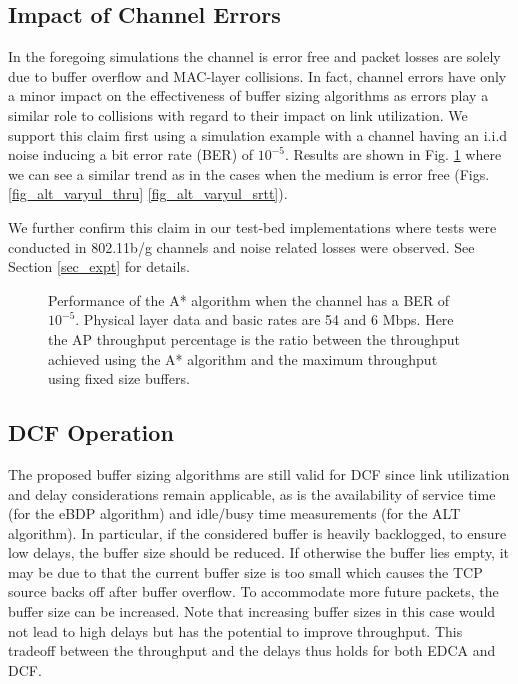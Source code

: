 \documentclass[10pt,twocolumn, journal]{IEEEtran}
\begin{document}
\subsection{Impact of Channel Errors}
In the foregoing simulations the channel is error free and packet losses are solely due to buffer overflow and MAC-layer collisions.  In fact, channel errors have only a minor impact on the effectiveness of buffer sizing algorithms as errors play a similar role to collisions with regard to their impact on link utilization. We support this claim first using a simulation example with a channel having an i.i.d noise inducing a bit error rate (BER) of $10^{-5}$.  Results are shown in Fig. \ref{fig_channelerror} where we can see a similar trend as in the cases when the medium is error free (Figs. \ref{fig_alt_varyul_thru} \ref{fig_alt_varyul_srtt}).

We further confirm this claim in our test-bed implementations where tests were conducted in 802.11b/g channels and noise related losses were observed. See Section \ref{sec_expt} for details.

\begin{figure}[tb]
   \centering
   \caption{Performance of the A* algorithm when the channel has a BER of $10^{-5}$. Physical layer data and basic rates are 54 and 6 Mbps. Here the AP throughput percentage is the ratio between the throughput achieved using the A* algorithm and the maximum throughput using fixed size buffers.}
   \label{fig_channelerror}
\end{figure}

\subsection{DCF Operation}

The proposed buffer sizing algorithms are still valid for DCF since link utilization and delay considerations remain applicable, as is the availability of service time (for the eBDP algorithm) and idle/busy time measurements (for the ALT algorithm). In particular, if the considered buffer is heavily backlogged, to ensure low delays, the buffer size should be reduced. If otherwise the buffer lies empty, it may be due to that the current buffer size is too small which causes the TCP source backs off after buffer overflow. To accommodate more future packets, the buffer size can be increased. Note that increasing buffer sizes in this case would not lead to high delays but has the potential to improve throughput. This tradeoff between the throughput and the delays thus holds for both EDCA and DCF.
\end{document}
